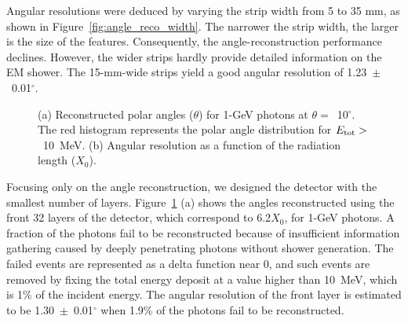 \documentclass[preprint,12pt,times,a4paper]{elsarticle}
\begin{document}
Angular resolutions were deduced by varying the strip width from 5 to 35 mm, as shown in Figure~\ref{fig:angle_reco_width}. The narrower the strip width, the larger is the size of the features. Consequently, the angle-reconstruction performance declines. However, the wider strips hardly provide detailed information on the EM shower. The 15-mm-wide strips yield a good angular resolution of 1.23~$\pm$~0.01$^{\circ}$.

\begin{figure}[!hbt]
\centering
{}
\caption{ (a) Reconstructed polar angles ($\theta$) for 1-GeV photons at $\theta=$~10$^{\circ}$. The red histogram represents the polar angle distribution for $E_{\rm{tot}}>$~10~MeV. (b) Angular resolution as a function of the radiation length ($X_{0}$).}
\label{fig:angle_reco_layer}
\end{figure}

Focusing only on the angle reconstruction, we designed the detector with the smallest number of layers. Figure~\ref{fig:angle_reco_layer} (a) shows the angles reconstructed using the front 32 layers of the detector, which correspond to 6.2$X_{0}$, for 1-GeV photons. A fraction of the photons fail to be reconstructed because of insufficient information gathering caused by deeply penetrating photons without shower generation. The failed events are represented as a delta function near 0, and such events are removed by fixing the total energy deposit at a value higher than 10~MeV, which is 1\% of the incident energy. The angular resolution of the front layer is estimated to be 1.30~$\pm$~0.01$^{\circ}$ when 1.9\% of the photons fail to be reconstructed.
\end{document}
